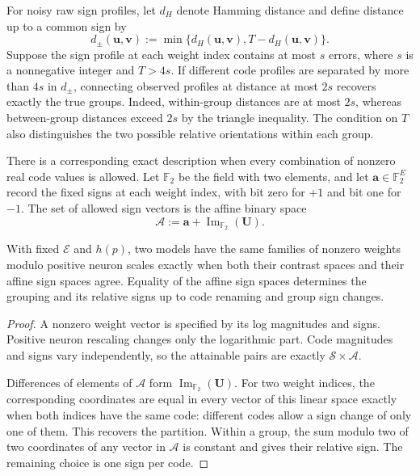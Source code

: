 For noisy raw sign profiles, let $d_H$ denote Hamming distance and define
distance up to a common sign by
\begin{equation*}
    d_\pm(\mathbf u,\mathbf v)
    :=\min\{d_H(\mathbf u,\mathbf v),
                  T-d_H(\mathbf u,\mathbf v)\}.
\end{equation*}
Suppose the sign profile at each weight index contains at most $s$ errors,
where $s$ is a nonnegative integer and $T>4s$.
If different code profiles are separated by more than $4s$
in $d_\pm$, connecting observed profiles at distance at most
$2s$ recovers exactly the true groups.
Indeed, within-group distances are at most $2s$, whereas
between-group distances exceed $2s$ by the triangle inequality.
The condition on $T$ also distinguishes the two possible
relative orientations within each group.

There is a corresponding exact description when every combination
of nonzero real code values is allowed.
Let $\mathbb F_2$ be the field with two elements, and let
$\mathbf a\in\mathbb F_2^E$ record the fixed signs at
each weight index, with bit zero for $+1$ and bit one for $-1$.
The set of allowed sign vectors is the affine binary space
\begin{equation}
    \mathcal A
    :=\mathbf a
        +\operatorname{Im}_{\mathbb F_2}(\mathbf U).
    \label{eq:appendix-theory-sign-space}
\end{equation}

\begin{proposition}
    \label{prop:theory-complete-signs}
    With fixed $\mathcal E$ and $h(p)$, two models have the
    same families of nonzero weights modulo positive neuron
    scales exactly when both their contrast spaces and their
    affine sign spaces agree.
    Equality of the affine sign spaces determines the grouping
    and its relative signs up to code renaming and group sign changes.
\end{proposition}

\begin{proof}
    A nonzero weight vector is specified by its log magnitudes
    and signs. Positive neuron rescaling changes only the
    logarithmic part. Code magnitudes and signs vary independently,
    so the attainable pairs are exactly
    $\mathcal S\times\mathcal A$.

    Differences of elements of $\mathcal A$ form
    $\operatorname{Im}_{\mathbb F_2}(\mathbf U)$.
    For two weight indices, the corresponding coordinates are equal
    in every vector of this linear space exactly when both indices
    have the same code:
    different codes allow a sign change of only one of them.
    This recovers the partition.
    Within a group, the sum modulo two of two coordinates of
    any vector in $\mathcal A$ is constant and
    gives their relative sign. The remaining choice is one
    sign per code.
\end{proof}


